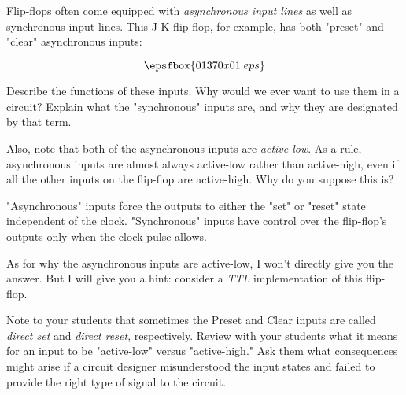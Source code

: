 

Flip-flops often come equipped with {\it asynchronous input lines} as well as synchronous input lines.  This J-K flip-flop, for example, has both "preset" and "clear" asynchronous inputs:

$$\epsfbox{01370x01.eps}$$

Describe the functions of these inputs.  Why would we ever want to use them in a circuit?  Explain what the "synchronous" inputs are, and why they are designated by that term.

Also, note that both of the asynchronous inputs are {\it active-low}.  As a rule, asynchronous inputs are almost always active-low rather than active-high, even if all the other inputs on the flip-flop are active-high.  Why do you suppose this is?







"Asynchronous" inputs force the outputs to either the "set" or "reset" state independent of the clock.  "Synchronous" inputs have control over the flip-flop's outputs only when the clock pulse allows.

As for why the asynchronous inputs are active-low, I won't directly give you the answer.  But I will give you a hint: consider a {\it TTL} implementation of this flip-flop.







Note to your students that sometimes the Preset and Clear inputs are called {\it direct set} and {\it direct reset}, respectively.  Review with your students what it means for an input to be "active-low" versus "active-high."  Ask them what consequences might arise if a circuit designer misunderstood the input states and failed to provide the right type of signal to the circuit.




